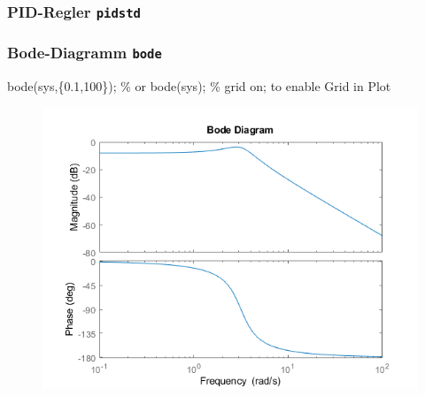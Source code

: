 \documentclass[
  10pt,
  a4paper,
]{article}
\newenvironment{Shaded}{}{}
\newcommand{\CommentTok}[1]{\textcolor[rgb]{0.42,0.45,0.49}{#1}}
\newcommand{\FloatTok}[1]{\textcolor[rgb]{0.00,0.36,0.77}{#1}}
\newcommand{\NormalTok}[1]{\textcolor[rgb]{0.14,0.16,0.18}{#1}}
\newcommand{\OperatorTok}[1]{\textcolor[rgb]{0.14,0.16,0.18}{#1}}
\newcommand{\VariableTok}[1]{\textcolor[rgb]{0.89,0.38,0.04}{#1}}
\numberwithin{equation}{section}
\begin{document}
\begin{multicols}{2}
\hypertarget{pid-regler-pidstd}{%
\subsubsection{\texorpdfstring{PID-Regler
\texttt{pidstd}}{PID-Regler pidstd}}\label{pid-regler-pidstd}}

\begin{Shaded}
\begin{Highlighting}[]

\end{Highlighting}
\end{Shaded}

\hypertarget{bode-diagramm-bode}{%
\subsubsection{\texorpdfstring{Bode-Diagramm
\texttt{bode}}{Bode-Diagramm bode}}\label{bode-diagramm-bode}}

\begin{Shaded}
\begin{Highlighting}[]
\VariableTok{bode}\NormalTok{(}\VariableTok{sys}\OperatorTok{,}\NormalTok{\{}\FloatTok{0.1}\OperatorTok{,}\FloatTok{100}\NormalTok{\})}\OperatorTok{;} \CommentTok{\% or bode(sys);}
\CommentTok{\% grid on; to enable Grid in Plot}
\end{Highlighting}
\end{Shaded}

\begin{figure}[H]

{\centering \includegraphics{images/matlab_BodePlotResponse.png}

}
\end{figure}
\end{multicols}
\end{document}
